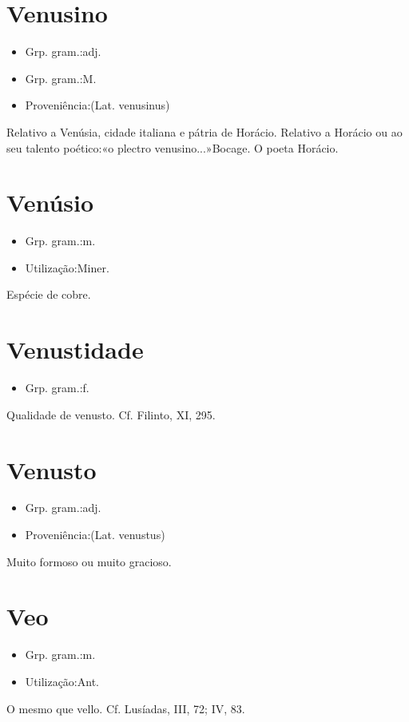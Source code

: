 \documentclass{article}
\begin{document}
\section{Venusino}
\begin{itemize}
\item {Grp. gram.:adj.}
\end{itemize}
\begin{itemize}
\item {Grp. gram.:M.}
\end{itemize}
\begin{itemize}
\item {Proveniência:(Lat. \textunderscore venusinus\textunderscore )}
\end{itemize}
Relativo a Venúsia, cidade italiana e pátria de Horácio.
Relativo a Horácio ou ao seu talento poético:«\textunderscore o plectro venusino...\textunderscore »Bocage.
O poeta Horácio.
\section{Venúsio}
\begin{itemize}
\item {Grp. gram.:m.}
\end{itemize}
\begin{itemize}
\item {Utilização:Miner.}
\end{itemize}
Espécie de cobre.
\section{Venustidade}
\begin{itemize}
\item {Grp. gram.:f.}
\end{itemize}
Qualidade de venusto. Cf. Filinto, XI, 295.
\section{Venusto}
\begin{itemize}
\item {Grp. gram.:adj.}
\end{itemize}
\begin{itemize}
\item {Proveniência:(Lat. \textunderscore venustus\textunderscore )}
\end{itemize}
Muito formoso ou muito gracioso.
\section{Veo}
\begin{itemize}
\item {Grp. gram.:m.}
\end{itemize}
\begin{itemize}
\item {Utilização:Ant.}
\end{itemize}
O mesmo que \textunderscore vello\textunderscore . Cf. \textunderscore Lusíadas\textunderscore , III, 72; IV, 83.
\end{document}
